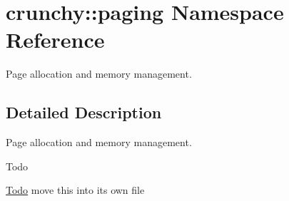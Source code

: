 \hypertarget{namespacecrunchy_1_1paging}{}\section{crunchy\+:\+:paging Namespace Reference}
\label{namespacecrunchy_1_1paging}


Page allocation and memory management.  




\subsection{Detailed Description}
Page allocation and memory management. 

\begin{DoxyRefDesc}{Todo}
\item[\hyperlink{todo__todo000001}{Todo}]move this into its own file \end{DoxyRefDesc}
